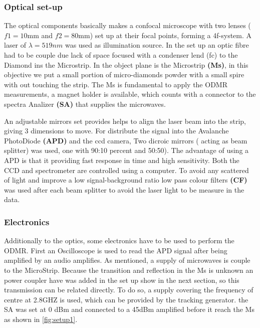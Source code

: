  \subsubsection{Optical set-up}
 
The optical components basically makes a confocal microscope with two lenses ($f1=10\mathrm{mm}$ and $f2=80\mathrm{mm}$) set up at their focal points, forming a 4f-system. A laser of $\lambda=519nm$ was used as illumination source. In the set up an optic fibre had to be couple due lack of space focused with a condenser lend (fc) to the Diamond ins the Microstrip.
In the object plane is the Microstrip \textbf{(Ms)}, in this objective we put a small portion of micro-diamonds powder with a small spire with out touching the strip. The Ms is fundamental to apply the ODMR measurements, a magnet holder is available, which counts with a connector to the spectra Analizer \textbf{(SA)} that supplies the microwaves.

An adjustable mirrors set provides helps to align the laser beam into the strip, giving 3 dimensions to move. For distribute the signal into the Avalanche PhotoDiode \textbf{(APD)} and the ccd camera, Two dicroic mirrors ( acting as beam splitter) was used, one with 90:10 percent and 50:50). The advantage of using a APD is that it providing fast response in time and high sensitivity. Both the CCD and spectrometer are controlled using a computer. To avoid any scattered of light and improve a low signal-background ratio  low pass colour filters \textbf{(CF)} was used after each beam splitter to avoid the laser light to be measure in the data.

\subsubsection{Electronics}

Additionally to the optics, some electronics have to be used to perform the ODMR. First an Oscilloscope is used to read the APD signal after being amplified by an audio amplifies.  As mentioned, a supply of microwaves is couple to the MicroStrip.
Because the transition and reflection in the Ms is unknown an power coupler have was added in the set up show in the next section, so this transmission can be related directly.  To do so, a supply covering the frequency of centre at 2.8GHZ is used, which can be provided by the tracking generator. the SA  was set at 0 dBm and connected to a 45dBm amplified before it reach the Ms as shown in \ref{fig:setup1}.

